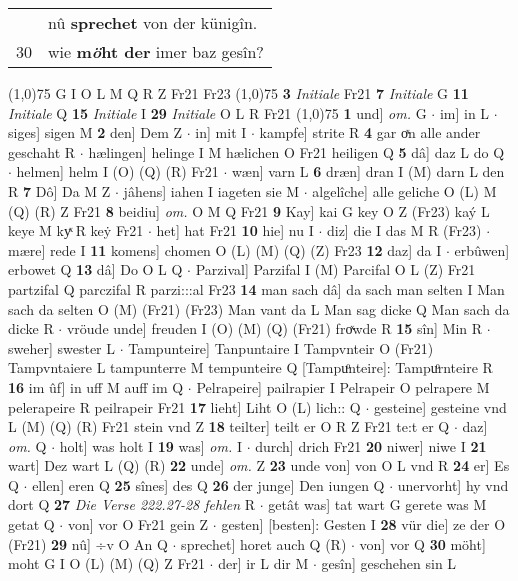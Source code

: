 \documentclass[8pt,a4paper,notitlepage]{article}
\begin{document}
\begin{table}[ht]
\begin{minipage}[t]{0.5\linewidth}
\begin{tabular}{rl}
 & nû \textbf{sprechet} von der künigîn.\\ 
30 & wie \textbf{m\textit{ö}ht der} imer baz gesîn?\\ 
\end{tabular}
\scriptsize
\line(1,0){75} \newline
G I O L M Q R Z Fr21 Fr23 \newline
\line(1,0){75} \newline
\textbf{3} \textit{Initiale} Fr21  \textbf{7} \textit{Initiale} G  \textbf{11} \textit{Initiale} Q  \textbf{15} \textit{Initiale} I  \textbf{29} \textit{Initiale} O L R Fr21  \newline
\line(1,0){75} \newline
\textbf{1} und] \textit{om.} G  $\cdot$ im] in L  $\cdot$ siges] sigen M \textbf{2} den] Dem Z  $\cdot$ in] mit I  $\cdot$ kampfe] strite R \textbf{4} gar oͯn alle ander geschaht R  $\cdot$ hælingen] helinge I M hælichen O Fr21 heiligen Q \textbf{5} dâ] daz L do Q  $\cdot$ helmen] helm I (O) (Q) (R) Fr21  $\cdot$ wæn] varn L \textbf{6} dræn] dran I (M) darn L den R \textbf{7} Dô] Da M Z  $\cdot$ jâhens] iahen I iageten sie M  $\cdot$ algelîche] alle geliche O (L) M (Q) (R) Z Fr21 \textbf{8} beidiu] \textit{om.} O M Q Fr21 \textbf{9} Kay] kai G key O Z (Fr23) kaý L keye M kyͯ R keẏ Fr21  $\cdot$ het] hat Fr21 \textbf{10} hie] nu I  $\cdot$ diz] die I das M R (Fr23)  $\cdot$ mære] rede I \textbf{11} komens] chomen O (L) (M) (Q) (Z) Fr23 \textbf{12} daz] da I  $\cdot$ erbûwen] erbowet Q \textbf{13} dâ] Do O L Q  $\cdot$ Parzival] Parzifal I (M) Parcifal O L (Z) Fr21 partzifal Q parczifal R parzi:::al Fr23 \textbf{14} man sach dâ] da sach man selten I Man sach da selten O (M) (Fr21) (Fr23) Man vant da L Man sag dicke Q Man sach da dicke R  $\cdot$ vröude unde] freuden I (O) (M) (Q) (Fr21) froͯwde R \textbf{15} sîn] Min R  $\cdot$ sweher] swester L  $\cdot$ Tampunteire] Tanpuntaire I Tampvnteir O (Fr21) Tampvntaiere L tampunterre M tempunteire Q [Tampuͦnteire]: Tampuͦrnteire R \textbf{16} im ûf] in uff M auff im Q  $\cdot$ Pelrapeire] pailrapier I Pelrapeir O pelrapere M pelerapeire R peilrapeir Fr21 \textbf{17} lieht] Liht O (L) lich:: Q  $\cdot$ gesteine] gesteine vnd L (M) (Q) (R) Fr21 stein vnd Z \textbf{18} teilter] teilt er O R Z Fr21 te:t er Q  $\cdot$ daz] \textit{om.} Q  $\cdot$ holt] was holt I \textbf{19} was] \textit{om.} I  $\cdot$ durch] drich Fr21 \textbf{20} niwer] niwe I \textbf{21} wart] Dez wart L (Q) (R) \textbf{22} unde] \textit{om.} Z \textbf{23} unde von] von O L vnd R \textbf{24} er] Es Q  $\cdot$ ellen] eren Q \textbf{25} sînes] des Q \textbf{26} der junge] Den iungen Q  $\cdot$ unervorht] hy vnd dort Q \textbf{27} \textit{Die Verse 222.27-28 fehlen} R   $\cdot$ getât was] tat wart G gerete was M getat Q  $\cdot$ von] vor O Fr21 gein Z  $\cdot$ gesten] [besten]: Gesten I \textbf{28} vür die] ze der O (Fr21) \textbf{29} nû] ÷v O An Q  $\cdot$ sprechet] horet auch Q (R)  $\cdot$ von] vor Q \textbf{30} möht] moht G I O (L) (M) (Q) Z Fr21  $\cdot$ der] ir L dir M  $\cdot$ gesîn] geschehen sin L \newline

\end{minipage}
\end{table}
\end{document}
